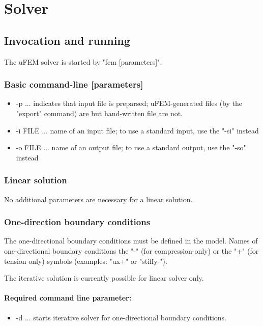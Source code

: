 \documentclass{article}
\begin{document}
\section{Solver}

\subsection{Invocation and running}

 The uFEM solver is started by "fem [parameters]". 



\subsubsection{Basic command-line [parameters]}
\begin{itemize}
\item  -p ... indicates that input file is preparsed; uFEM-generated files (by the "export" command) are but hand-written file are not.
\item  -i FILE ... name of an input file; to use a standard input, use the "-si" instead
\item  -o FILE ... name of an output file; to use a standard output, use the "-so" instead
\end{itemize}

\subsubsection{Linear solution}

 No additional parameters are necessary for a linear solution.



\subsubsection{One-direction boundary conditions}

 The one-directional boundary conditions must be defined
 in the model. Names of one-directional boundary conditions 
 the "-" (for compression-only) or the "+" (for tension only) symbols
 (examples: "ux+" or "stiffy-").

 The iterative solution is currently possible  for linear
 solver only.



\paragraph{Required command line parameter:}
\begin{itemize}
\item  -d ... starts iterative solver for one-directional boundary conditions.
\end{itemize}
\end{document}
